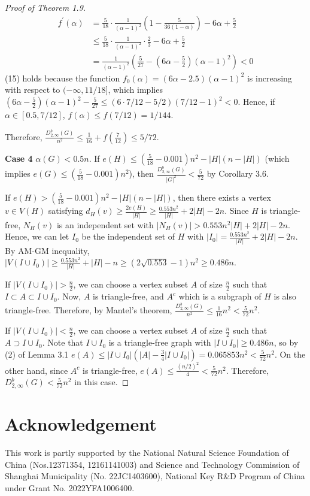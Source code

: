 \documentclass[11pt, oneside]{article}   	%
\begin{document}
\begin{proof}[Proof of Theorem 1.9]
\begin{align}
    f^{'}(\alpha)&=\frac{5}{18}\cdot \frac 1 {(\alpha-1)^2}\left(1-\frac{5}{36(1-\alpha)}\right)-6\alpha +\frac 5 2\\
    &\leq \frac{5}{18}\cdot \frac 1 {(\alpha-1)^2}\cdot \frac{2}{3}-6\alpha +\frac{5}{2}\\
    &=\frac{1}{(\alpha-1)^2}\left(\frac{5}{27}-(6\alpha -\frac 5 2)(\alpha-1)^2\right) <0
\end{align}
(15) holds because the function $f_0(\alpha)=(6\alpha -2.5)(\alpha-1)^2$ is increasing with respect to $(-\infty,11/18]$, which implies $(6\alpha -\frac 5 2)(\alpha-1)^2-\frac {5}{27}\leq (6 \cdot 7/12-5/2)(7/12-1)^2<0$. Hence, if $\alpha \in[0.5,7/12]$, $f(\alpha)\leq f(7/12)=1/144$.  

Therefore, $\frac{D_{2,\infty}^b(G)}{n^2}\leq \frac{1}{16}+f(\frac{7}{12})\leq 5/72$. 

\textbf{Case 4} $\alpha(G)<0.5n$. If $e(H)\leq (\frac{5}{18}-0.001)n^2-|H|(n-|H|)$ (which implies $e(G)\leq (\frac{5}{18}-0.001)n^2$), then $\frac{D_{2,\infty}^b(G)}{|G|^2}<\frac{5}{72}$ by Corollary 3.6. 

If $e(H)> (\frac{5}{18}-0.001)n^2-|H|(n-|H|)$, then there exists a vertex $v\in V(H)$ satisfying $d_{H}(v)\geq \frac{2e(H)}{|H|}\geq \frac{0.553n^2}{|H|}+2|H|-2n$. Since $H$ is triangle-free, $N_H(v)$ is an independent set with $|N_H(v)|>{0.553n^2}{|H|}+2|H|-2n$. Hence, we can let $I_0$ be the independent set of $H$ with $|I_0|=\frac{0.553n^2}{|H|}+2|H|-2n$. By AM-GM inequality, $|V(I\cup I_0)|\geq \frac{0.553n^2}{|H|}+|H|-n\geq (2\sqrt{0.553}-1)n^2\geq 0.486 n$.

If $|V(I\cup I_0)|>\frac{n}{2}$, we can choose a vertex subset $A$ of size $\frac n 2$ such that $I\subset A\subset I\cup I_0$. Now, $A$ is triangle-free, and $A^c$ which is a subgraph of $H$ is also triangle-free. Therefore, by Mantel's theorem, $\frac{D_{2,\infty}^b(G)}{n^2}\leq \frac 1 {16} n^2<\frac{5}{72} n^2$.

If $|V(I\cup I_0)|<\frac{n}{2}$, we can choose a vertex subset $A$ of size $\frac n 2$ such that $A\supset I\cup I_0$. Note that $I\cup I_0$ is a triangle-free graph with $|I\cup I_0|\geq 0.486 n$, so by (2) of Lemma 3.1 $e(A)\leq |I\cup I_0|(|A|-\frac{3}{4}|I\cup I_0|)=0.065853n^2<\frac{5}{72}n^2$. On the other hand, since $A^c$ is triangle-free, $e(A)\leq \frac{(n/2)^2}{4}<\frac{5}{72}n^2$. Therefore, $D_{2,\infty}^b(G)<\frac{5}{72}n^2$ in this case.
    
\end{proof}
\section*{Acknowledgement}
This work is partly supported by the National Natural Science Foundation of China (Nos.12371354, 
12161141003) and Science and Technology Commission of Shanghai Municipality (No. 22JC1403600),
National Key R\&D Program of China under Grant No. 2022YFA1006400.




\appendix
\end{document}
